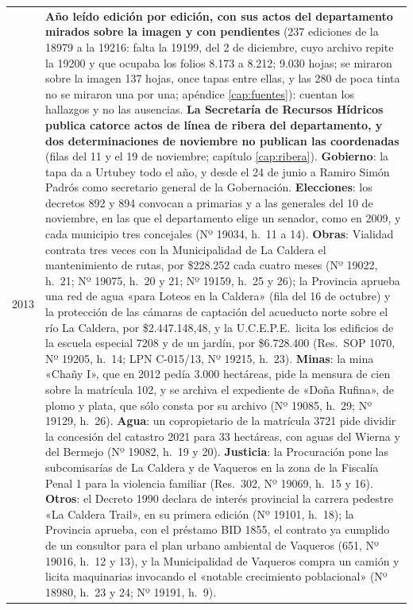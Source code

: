 \begin{longtable}{@{}p{2.7cm}p{10.3cm}@{}}
2013 & \textbf{Año leído edición por edición, con sus actos del departamento mirados sobre la imagen y con pendientes} (237 ediciones de la 18979 a la 19216: falta la 19199, del 2 de diciembre, cuyo archivo repite la 19200 y que ocupaba los folios 8.173 a 8.212; 9.030 hojas; se miraron sobre la imagen 137 hojas, once tapas entre ellas, y las 280 de poca tinta no se miraron una por una; apéndice \ref{cap:fuentes}): cuentan los hallazgos y no las ausencias. \textbf{La Secretaría de Recursos Hídricos publica catorce actos de línea de ribera del departamento, y dos determinaciones de noviembre no publican las coordenadas} (filas del 11 y el 19 de noviembre; capítulo \ref{cap:ribera}). \textbf{Gobierno}: la tapa da a Urtubey todo el año, y desde el 24 de junio a Ramiro Simón Padrós como secretario general de la Gobernación. \textbf{Elecciones}: los decretos 892 y 894 convocan a primarias y a las generales del 10 de noviembre, en las que el departamento elige un senador, como en 2009, y cada municipio tres concejales (Nº 19034, h.\ 11 a 14). \textbf{Obras}: Vialidad contrata tres veces con la Municipalidad de La Caldera el mantenimiento de rutas, por \$228.252 cada cuatro meses (Nº 19022, h.\ 21; Nº 19075, h.\ 20 y 21; Nº 19159, h.\ 25 y 26); la Provincia aprueba una red de agua «para Loteos en la Caldera» (fila del 16 de octubre) y la protección de las cámaras de captación del acueducto norte sobre el río La Caldera, por \$2.447.148,48, y la U.C.E.P.E.\ licita los edificios de la escuela especial 7208 y de un jardín, por \$6.728.400 (Res.\ SOP 1070, Nº 19205, h.\ 14; LPN C-015/13, Nº 19215, h.\ 23). \textbf{Minas}: la mina «Chañy I», que en 2012 pedía 3.000 hectáreas, pide la mensura de cien sobre la matrícula 102, y se archiva el expediente de «Doña Rufina», de plomo y plata, que sólo consta por su archivo (Nº 19085, h.\ 29; Nº 19129, h.\ 26). \textbf{Agua}: un copropietario de la matrícula 3721 pide dividir la concesión del catastro 2021 para 33 hectáreas, con aguas del Wierna y del Bermejo (Nº 19082, h.\ 19 y 20). \textbf{Justicia}: la Procuración pone las subcomisarías de La Caldera y de Vaqueros en la zona de la Fiscalía Penal 1 para la violencia familiar (Res.\ 302, Nº 19069, h.\ 15 y 16). \textbf{Otros}: el Decreto 1990 declara de interés provincial la carrera pedestre «La Caldera Trail», en su primera edición (Nº 19101, h.\ 18); la Provincia aprueba, con el préstamo BID 1855, el contrato ya cumplido de un consultor para el plan urbano ambiental de Vaqueros (651, Nº 19016, h.\ 12 y 13), y la Municipalidad de Vaqueros compra un camión y licita maquinarias invocando el «notable crecimiento poblacional» (Nº 18980, h.\ 23 y 24; Nº 19191, h.\ 9). \\

\end{longtable}
